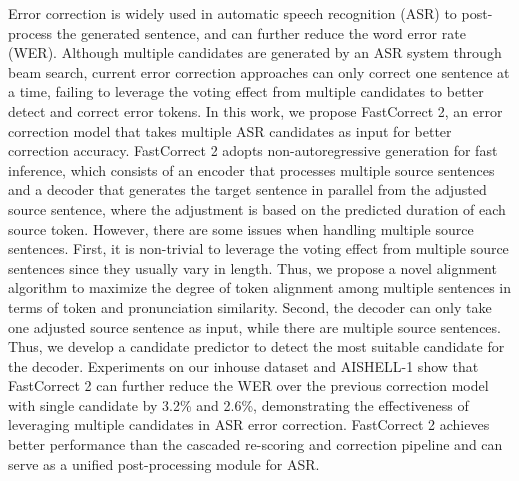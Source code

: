 Error correction is widely used in automatic speech recognition (ASR) to post-process the generated sentence, and can further reduce the word error rate (WER). Although multiple candidates are generated by an ASR system through beam search, current error correction approaches can only correct one sentence at a time, failing to leverage the voting effect from multiple candidates to better detect and correct error tokens. In this work, we propose FastCorrect 2, an error correction model that takes multiple ASR candidates as input for better correction accuracy. FastCorrect 2 adopts non-autoregressive generation for fast inference, which consists of an encoder that processes multiple source sentences and a decoder that generates the target sentence in parallel from the adjusted source sentence, where the adjustment is based on the predicted duration of each source token. However, there are some issues when handling multiple source sentences. First, it is non-trivial to leverage the voting effect from multiple source sentences since they usually vary in length. Thus, we propose a novel alignment algorithm to maximize the degree of token alignment among multiple sentences in terms of token and pronunciation similarity. Second, the decoder can only take one adjusted source sentence as input, while there are multiple source sentences. Thus, we develop a candidate predictor to detect the most suitable candidate for the decoder. Experiments on our inhouse dataset and AISHELL-1 show that FastCorrect 2 can further reduce the WER over the previous correction model with single candidate by 3.2\% and 2.6\%, demonstrating the effectiveness of leveraging multiple candidates in ASR error correction. FastCorrect 2 achieves better performance than the cascaded re-scoring and correction pipeline and can serve as a unified post-processing module for ASR.
